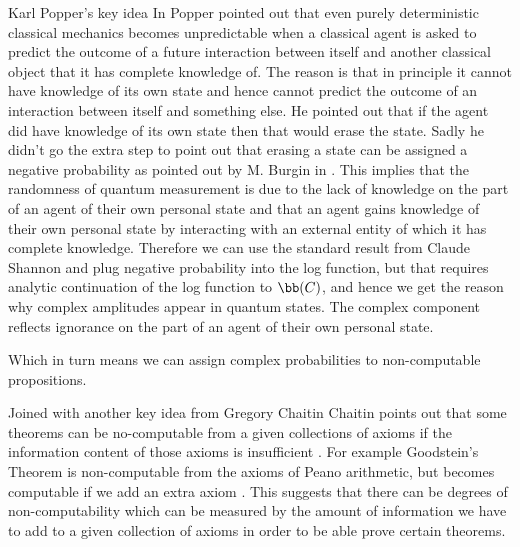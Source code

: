 \documentclass[final]{beamer}
\newlength{\colwidth}
\begin{document}
\begin{frame}[t]
\begin{columns}[t]
\begin{column}{\colwidth}
\begin{block}{Karl Popper's key idea}
In \autocite{Popper1950IndeterminismI, Popper1950IndeterminismII} Popper pointed out that even purely deterministic classical mechanics becomes unpredictable when a classical agent is asked to predict the outcome of a future interaction between itself and another classical object that it has complete knowledge of. The reason is that in principle it cannot have knowledge of its own state and hence cannot predict the outcome of an interaction between itself and something else. He pointed out that if the agent did have knowledge of its own state then that would erase the state. Sadly he didn't go the extra step to point out that erasing a state can be assigned a negative probability as pointed out by M. Burgin in \autocite{Burgin2013}. This implies that the randomness of quantum measurement is due to the lack of knowledge on the part of an agent of their own personal state and that an agent gains knowledge of their own personal state by interacting with an external entity of which it has complete knowledge. Therefore we can use the standard result from Claude Shannon \autocite{shannon_1948} and plug negative probability into the log function, but that requires analytic continuation of the log function to $\bb(C)$, and hence we get the reason why complex amplitudes appear in quantum states. The complex component reflects ignorance on the part of an agent of their own personal state. 

Which in turn means we can assign complex probabilities to non-computable propositions. 
\end{block}

\begin{block}{Joined with another key idea from Gregory Chaitin}
    Chaitin points out that some theorems can be no-computable from a given collections of axioms if the information content of those axioms is insufficient \autocite{Chaitin1987AlgorithmicTheory}. For example Goodstein's Theorem is non-computable from the axioms of Peano arithmetic, but becomes computable if we add an extra axiom \autocite{Kirby1982AccessibleArithmetic}. This suggests that there can be degrees of non-computability which can be measured by the amount of information we have to add to a given collection of axioms in order to be able prove certain theorems. 
    

\end{block}
\end{column}
\end{columns}
\end{frame}
\end{document}
